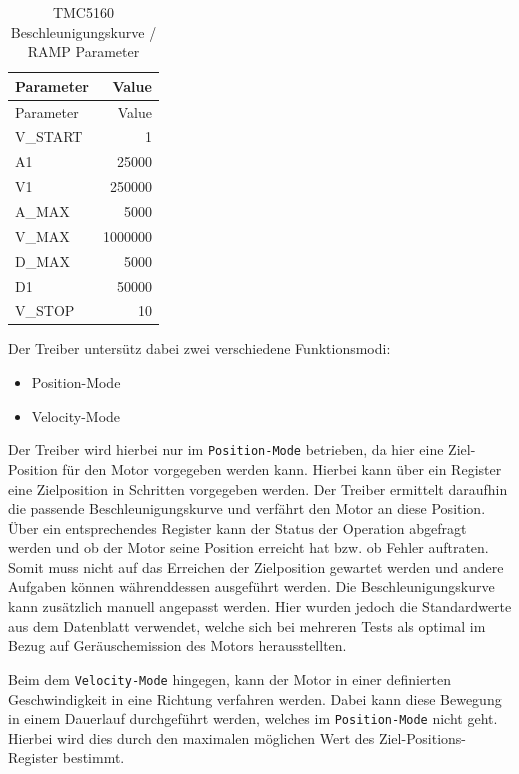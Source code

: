 \begin{longtable}[]{@{}lr@{}}
\caption{TMC5160 Beschleunigungskurve / RAMP Parameter
\label{tmcrampparams}}\tabularnewline
\toprule
Parameter & Value\tabularnewline
\midrule
\endfirsthead
\toprule
Parameter & Value\tabularnewline
\midrule
\endhead
V\_START & 1\tabularnewline
A1 & 25000\tabularnewline
V1 & 250000\tabularnewline
A\_MAX & 5000\tabularnewline
V\_MAX & 1000000\tabularnewline
D\_MAX & 5000\tabularnewline
D1 & 50000\tabularnewline
V\_STOP & 10\tabularnewline
\bottomrule
\end{longtable}

Der Treiber untersütz dabei zwei verschiedene Funktionsmodi:

\begin{itemize}
\tightlist
\item
  Position-Mode
\item
  Velocity-Mode
\end{itemize}

Der Treiber wird hierbei nur im \passthrough{\lstinline!Position-Mode!}
betrieben, da hier eine Ziel-Position für den Motor vorgegeben werden
kann. Hierbei kann über ein Register eine Zielposition in Schritten
vorgegeben werden. Der Treiber ermittelt daraufhin die passende
Beschleunigungskurve und verfährt den Motor an diese Position. Über ein
entsprechendes Register kann der Status der Operation abgefragt werden
und ob der Motor seine Position erreicht hat bzw. ob Fehler auftraten.
Somit muss nicht auf das Erreichen der Zielposition gewartet werden und
andere Aufgaben können währenddessen ausgeführt werden. Die
Beschleunigungskurve kann zusätzlich manuell angepasst werden. Hier
wurden jedoch die Standardwerte aus dem Datenblatt verwendet, welche
sich bei mehreren Tests als optimal im Bezug auf Geräuschemission des
Motors herausstellten.

Beim dem \passthrough{\lstinline!Velocity-Mode!} hingegen, kann der
Motor in einer definierten Geschwindigkeit in eine Richtung verfahren
werden. Dabei kann diese Bewegung in einem Dauerlauf durchgeführt
werden, welches im \passthrough{\lstinline!Position-Mode!} nicht geht.
Hierbei wird dies durch den maximalen möglichen Wert des
Ziel-Positions-Register bestimmt.

